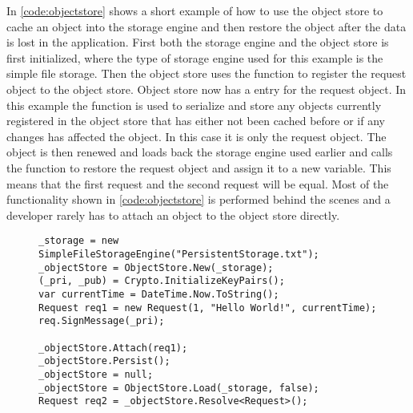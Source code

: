 In \autoref{code:objectstore} shows a short example of how to use the object store to cache an object into the storage engine and then restore the object after the data is lost in the application. First both the storage engine and the object store is first initialized, where the type of storage engine used for this example is the simple file storage. Then the object store uses the  function to register the request object to the object store. Object store now has a  entry for the request object. In this example the  function is used to serialize and store any objects currently registered in the object store that has either not been cached before or if any changes has affected the object. In this case it is only the request object. The object is then renewed and loads back the storage engine used earlier and calls the  function to restore the request object and assign it to a new variable. This means that the first request and the second request will be equal. Most of the functionality shown in \autoref{code:objectstore} is performed behind the scenes and a developer rarely has to attach an object to the object store directly.  

\begin{figure}[H]
	\centering
	\lstset{style=sharpc}
	\begin{lstlisting}[label = code:objectstore, caption=Object Store example, captionpos=b, basicstyle=\scriptsize]
_storage = new SimpleFileStorageEngine("PersistentStorage.txt");
_objectStore = ObjectStore.New(_storage);
(_pri, _pub) = Crypto.InitializeKeyPairs();	
var currentTime = DateTime.Now.ToString();
Request req1 = new Request(1, "Hello World!", currentTime);
req.SignMessage(_pri);
           
_objectStore.Attach(req1);
_objectStore.Persist();
_objectStore = null;
_objectStore = ObjectStore.Load(_storage, false);
Request req2 = _objectStore.Resolve<Request>();
	\end{lstlisting}
\end{figure}

